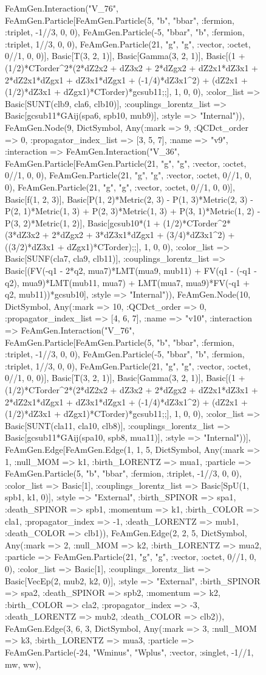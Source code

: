 \documentclass{revtex4}
\begin{document}
\begin{figure}[!htb]
\begin{center}
{FeAmGen.Interaction("V_76", FeAmGen.Particle[FeAmGen.Particle(5, "b", "bbar", :fermion, :triplet, -1//3, 0, 0), FeAmGen.Particle(-5, "bbar", "b", :fermion, :triplet, 1//3, 0, 0), FeAmGen.Particle(21, "g", "g", :vector, :octet, 0//1, 0, 0)], Basic[T(3, 2, 1)], Basic[Gamma(3, 2, 1)], Basic[(1 + (1/2)*CTorder^2*(2*dZ2x2 + dZ3x2 + 2*dZgx2 + dZ2x1*dZ3x1 + 2*dZ2x1*dZgx1 + dZ3x1*dZgx1 + (-1/4)*dZ3x1^2) + (dZ2x1 + (1/2)*dZ3x1 + dZgx1)*CTorder)*gcsub11;;], 1, 0, 0), :color_list => Basic[SUNT(clb9, cla6, clb10)], :couplings_lorentz_list => Basic[gcsub11*GAij(spa6, spb10, mub9)], :style => "Internal")), FeAmGen.Node(9, Dict{Symbol, Any}(:mark => 9, :QCDct_order => 0, :propagator_index_list => [3, 5, 7], :name => "v9", :interaction => FeAmGen.Interaction("V_36", FeAmGen.Particle[FeAmGen.Particle(21, "g", "g", :vector, :octet, 0//1, 0, 0), FeAmGen.Particle(21, "g", "g", :vector, :octet, 0//1, 0, 0), FeAmGen.Particle(21, "g", "g", :vector, :octet, 0//1, 0, 0)], Basic[f(1, 2, 3)], Basic[P(1, 2)*Metric(2, 3) - P(1, 3)*Metric(2, 3) - P(2, 1)*Metric(1, 3) + P(2, 3)*Metric(1, 3) + P(3, 1)*Metric(1, 2) - P(3, 2)*Metric(1, 2)], Basic[gcsub10*(1 + (1/2)*CTorder^2*(3*dZ3x2 + 2*dZgx2 + 3*dZ3x1*dZgx1 + (3/4)*dZ3x1^2) + ((3/2)*dZ3x1 + dZgx1)*CTorder);;], 1, 0, 0), :color_list => Basic[SUNF(cla7, cla9, clb11)], :couplings_lorentz_list => Basic[(FV(-q1 - 2*q2, mua7)*LMT(mua9, mub11) + FV(q1 - (-q1 - q2), mua9)*LMT(mub11, mua7) + LMT(mua7, mua9)*FV(-q1 + q2, mub11))*gcsub10], :style => "Internal")), FeAmGen.Node(10, Dict{Symbol, Any}(:mark => 10, :QCDct_order => 0, :propagator_index_list => [4, 6, 7], :name => "v10", :interaction => FeAmGen.Interaction("V_76", FeAmGen.Particle[FeAmGen.Particle(5, "b", "bbar", :fermion, :triplet, -1//3, 0, 0), FeAmGen.Particle(-5, "bbar", "b", :fermion, :triplet, 1//3, 0, 0), FeAmGen.Particle(21, "g", "g", :vector, :octet, 0//1, 0, 0)], Basic[T(3, 2, 1)], Basic[Gamma(3, 2, 1)], Basic[(1 + (1/2)*CTorder^2*(2*dZ2x2 + dZ3x2 + 2*dZgx2 + dZ2x1*dZ3x1 + 2*dZ2x1*dZgx1 + dZ3x1*dZgx1 + (-1/4)*dZ3x1^2) + (dZ2x1 + (1/2)*dZ3x1 + dZgx1)*CTorder)*gcsub11;;], 1, 0, 0), :color_list => Basic[SUNT(cla11, cla10, clb8)], :couplings_lorentz_list => Basic[gcsub11*GAij(spa10, spb8, mua11)], :style => "Internal"))], FeAmGen.Edge[FeAmGen.Edge(1, 1, 5, Dict{Symbol, Any}(:mark => 1, :null_MOM => k1, :birth_LORENTZ => mua1, :particle => FeAmGen.Particle(5, "b", "bbar", :fermion, :triplet, -1//3, 0, 0), :color_list => Basic[1], :couplings_lorentz_list => Basic[SpU(1, spb1, k1, 0)], :style => "External", :birth_SPINOR => spa1, :death_SPINOR => spb1, :momentum => k1, :birth_COLOR => cla1, :propagator_index => -1, :death_LORENTZ => mub1, :death_COLOR => clb1)), FeAmGen.Edge(2, 2, 5, Dict{Symbol, Any}(:mark => 2, :null_MOM => k2, :birth_LORENTZ => mua2, :particle => FeAmGen.Particle(21, "g", "g", :vector, :octet, 0//1, 0, 0), :color_list => Basic[1], :couplings_lorentz_list => Basic[VecEp(2, mub2, k2, 0)], :style => "External", :birth_SPINOR => spa2, :death_SPINOR => spb2, :momentum => k2, :birth_COLOR => cla2, :propagator_index => -3, :death_LORENTZ => mub2, :death_COLOR => clb2)), FeAmGen.Edge(3, 6, 3, Dict{Symbol, Any}(:mark => 3, :null_MOM => k3, :birth_LORENTZ => mua3, :particle => FeAmGen.Particle(-24, "Wminus", "Wplus", :vector, :singlet, -1//1, mw, ww), }
\end{center}
\end{figure}
\end{document}
